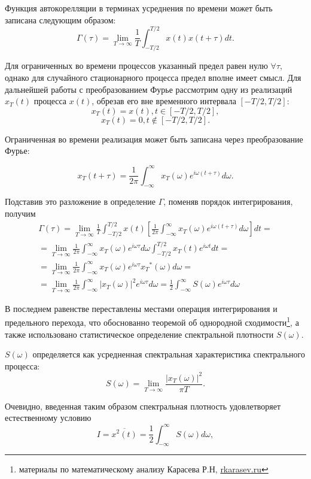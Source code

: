 \documentclass{urticle}
\begin{document}
Функция автокорелляции в терминах усреднения по времени может быть записана следующим образом:
	$$\Gamma(\tau) = \lim\limits_{T\rightarrow\infty} \frac{1}{T} \int_{-T/2}^{T/2} x(t)x(t+\tau)dt.$$
	
Для ограниченных во времени процессов указанный предел равен нулю $\forall \tau$, однако для случайного стационарного процесса предел вполне имеет смысл. Для дальнейшей работы с преобразованием Фурье рассмотрим одну из реализаций $x_T(t)$ процесса $x(t)$, обрезав его вне временного интервала $[-T/2, T/2]$:
$$x_T(t) = x(t), t \in [-T/2, T/2],$$
$$x_T(t) = 0 ,  t \notin [-T/2, T/2].$$

Ограниченная во времени реализация может быть записана через преобразование Фурье:

$$x_T(t+\tau) = \frac{1}{2\pi}\int_{-\infty}^{\infty}x_T(\omega)e^{i\omega(t+\tau)}d\omega.$$

Подставив это разложение в определение $\Gamma$, поменяв порядок интегрирования, получим
\begin{multline*}
	\Gamma(\tau) = \lim\limits_{T\rightarrow\infty} \frac{1}{T} \int_{-T/2}^{T/2} x(t) \left[ \frac{1}{2\pi}\int_{-\infty}^{\infty}x_T(\omega)e^{i\omega(t+\tau)}d\omega \right ] dt =\\
	=\lim\limits_{T\rightarrow\infty} \frac{1}{2\pi}\int_{-\infty}^{\infty}x_T(\omega)e^{i\omega\tau}d\omega \int_{-T/2}^{T/2} x_T(t) e^{i \omega t} dt =\\
	=\lim\limits_{T\rightarrow\infty} \frac{1}{2\pi}\int_{-\infty}^{\infty}x_T(\omega)e^{i\omega\tau} {x_T}^*(\omega) d\omega =\\
	=\lim\limits_{T\rightarrow\infty} \frac{1}{2\pi}\int_{-\infty}^{\infty}|x_T(\omega)|^2 e^{i\omega\tau} d\omega = \frac{1}{2}\int_{-\infty}^{\infty} S(\omega) e^{i\omega \tau} d \omega 
\end{multline*}

В последнем равенстве переставлены местами операция интегрирования и предельного перехода, что обоснованно теоремой об однородной сходимости\footnote{материалы по математическому анализу Карасева Р.Н, \href{http://www.rkarasev.ru}{rkarasev.ru}}, а также использовано статистическое определение спектральной плотности $S(\omega)$.

$S(\omega)$ определяется как усредненная спектральная характеристика спектрального процесса:
$$S(\omega) = \lim\limits_{T\rightarrow\infty} \frac{|x_T(\omega)|^2}{\pi T}.$$

Очевидно, введенная таким образом спектральная плотность удовлетворяет естественному условию
$$I = \overline{x^2(t)} = \frac{1}{2} \int_{-\infty}^{\infty} S(\omega) d\omega,$$
\end{document}
